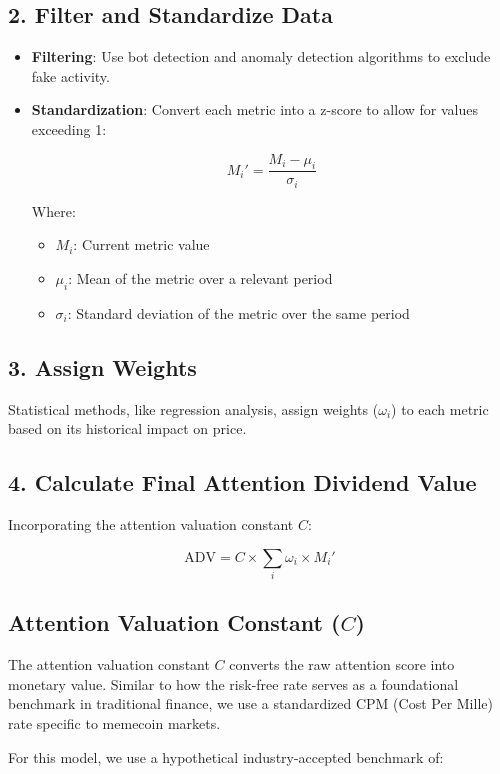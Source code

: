 \documentclass[a4paper,12pt]{article}
\begin{document}
\subsection*{2. Filter and Standardize Data}
\begin{itemize}
    \item \textbf{Filtering}: Use bot detection and anomaly detection algorithms to exclude fake activity.
    \item \textbf{Standardization}: Convert each metric into a z-score to allow for values exceeding 1:

    \[
    M_i' = \frac{M_i - \mu_i}{\sigma_i}
    \]

    Where:
    \begin{itemize}
        \item \( M_i \): Current metric value
        \item \( \mu_i \): Mean of the metric over a relevant period
        \item \( \sigma_i \): Standard deviation of the metric over the same period
    \end{itemize}
\end{itemize}

\subsection*{3. Assign Weights}
Statistical methods, like regression analysis, assign weights (\( \omega_i \)) to each metric based on its historical impact on price.

\subsection*{4. Calculate Final Attention Dividend Value}
Incorporating the attention valuation constant \( C \):

\[
\text{ADV} = C \times \sum_{i} \omega_i \times M_i'
\]

\subsection*{Attention Valuation Constant (\( C \))}

The attention valuation constant \( C \) converts the raw attention score into monetary value. Similar to how the risk-free rate serves as a foundational benchmark in traditional finance, we use a standardized CPM (Cost Per Mille) rate specific to memecoin markets.

For this model, we use a hypothetical industry-accepted benchmark of:
\end{document}

